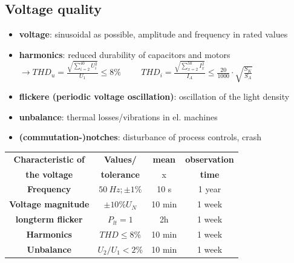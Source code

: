 	\subsection{Voltage quality}
	\begin{multicols}{2}


		{\footnotesize 	\begin{itemize}
		\setlength{\itemsep}{0pt}
		\item \textbf{voltage}: sinusoidal as possible, amplitude and frequency in rated values
		\item \textbf{harmonics}: reduced durability of capacitors and motors \\$\rightarrow THD_u = \frac{\sqrt{\sum_{i = 2}^{40} U_i^2}}{U_1} \leq 8 \% \hspace{1cm} THD_i = \frac{\sqrt{\sum_{x = 2}^{50} I_x^2}}{I_A} \leq \frac{20}{1000} \cdot \sqrt{\frac{S_{K}}{S_A}}  $
		\item \textbf{flickere (periodic voltage oscillation)}: oscillation of the light density
		\item \textbf{unbalance}: thermal losses/vibrations in el. machines
		\item \textbf{(commutation-)notches}: disturbance of process controls, crash
		\end{itemize}}
	
		{\footnotesize 	\begin{tabular}{|c|c|c|c|}
		\hline \textbf{Characteristic of} &\textbf{Values/} & \textbf{mean} & \textbf{observation}\\
		 \textbf{the voltage} & \textbf{tolerance} & x & \textbf{time} \\ 
		\hline \textbf{Frequency} & $50~Hz; \pm 1\%$ & 10 s & 1 year \\ 
		\hline \textbf{Voltage magnitude} & $\pm 10\% U_N$ & 10 min & 1 week \\ 
		\hline \textbf{longterm flicker} & $P_{lt} = 1$ & 2h & 1 week \\ 
		\hline \textbf{Harmonics} & $THD \leq 8\%$ & 10 min & 1 week \\ 
		\hline \textbf{Unbalance} & $U_2/U_1 < 2\%$ & 10 min & 1 week \\ 
		\hline 
		\end{tabular} }
	\end{multicols}
	
